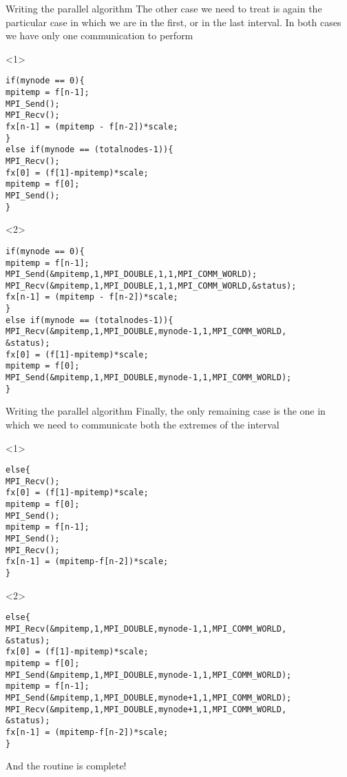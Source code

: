 \documentclass[xcolor={svgnames,usenames}]{beamer}
\begin{document}
\begin{frame}[fragile]{Writing the parallel algorithm}
The other case we need to treat is again the particular case in which we are in the first, or in the last interval. In both cases we have only one communication to perform
\begin{onlyenv}<1>
\begin{verbatim}
if(mynode == 0){
mpitemp = f[n-1];
MPI_Send();
MPI_Recv();
fx[n-1] = (mpitemp - f[n-2])*scale;
}
else if(mynode == (totalnodes-1)){
MPI_Recv();
fx[0] = (f[1]-mpitemp)*scale;
mpitemp = f[0];
MPI_Send();
}
\end{verbatim}
\end{onlyenv}
\begin{onlyenv}<2>
\begin{verbatim}
if(mynode == 0){
mpitemp = f[n-1];
MPI_Send(&mpitemp,1,MPI_DOUBLE,1,1,MPI_COMM_WORLD);
MPI_Recv(&mpitemp,1,MPI_DOUBLE,1,1,MPI_COMM_WORLD,&status);
fx[n-1] = (mpitemp - f[n-2])*scale;
}
else if(mynode == (totalnodes-1)){
MPI_Recv(&mpitemp,1,MPI_DOUBLE,mynode-1,1,MPI_COMM_WORLD, 
&status);
fx[0] = (f[1]-mpitemp)*scale;
mpitemp = f[0];
MPI_Send(&mpitemp,1,MPI_DOUBLE,mynode-1,1,MPI_COMM_WORLD);
}
\end{verbatim}
\end{onlyenv}
\end{frame}

\begin{frame}[fragile]{Writing the parallel algorithm}
Finally, the only remaining case is the one in which we need to communicate both the extremes of the interval
\begin{onlyenv}<1>
\begin{verbatim}
else{
MPI_Recv();
fx[0] = (f[1]-mpitemp)*scale;
mpitemp = f[0];
MPI_Send();
mpitemp = f[n-1];
MPI_Send();
MPI_Recv();
fx[n-1] = (mpitemp-f[n-2])*scale;
}
\end{verbatim}
\end{onlyenv}
\begin{onlyenv}<2>
\begin{verbatim}
else{
MPI_Recv(&mpitemp,1,MPI_DOUBLE,mynode-1,1,MPI_COMM_WORLD, 
&status);
fx[0] = (f[1]-mpitemp)*scale;
mpitemp = f[0];
MPI_Send(&mpitemp,1,MPI_DOUBLE,mynode-1,1,MPI_COMM_WORLD);
mpitemp = f[n-1];
MPI_Send(&mpitemp,1,MPI_DOUBLE,mynode+1,1,MPI_COMM_WORLD);
MPI_Recv(&mpitemp,1,MPI_DOUBLE,mynode+1,1,MPI_COMM_WORLD, 
&status);
fx[n-1] = (mpitemp-f[n-2])*scale;
}
\end{verbatim}
And the routine is complete!
\end{onlyenv}
\end{frame}
\end{document}
